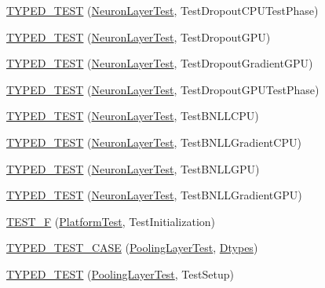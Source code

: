 \begin{DoxyCompactItemize}
\item 
\hyperlink{namespacecaffe_a6974fcca867bc014af426ec1fd8716d6}{T\+Y\+P\+E\+D\+\_\+\+T\+E\+S\+T} (\hyperlink{classcaffe_1_1_neuron_layer_test}{Neuron\+Layer\+Test}, Test\+Dropout\+C\+P\+U\+Test\+Phase)
\item 
\hyperlink{namespacecaffe_a9aa30748d330a1424448fa22c5c24593}{T\+Y\+P\+E\+D\+\_\+\+T\+E\+S\+T} (\hyperlink{classcaffe_1_1_neuron_layer_test}{Neuron\+Layer\+Test}, Test\+Dropout\+G\+P\+U)
\item 
\hyperlink{namespacecaffe_a47d4d4852f59e1990be706e36c600fe0}{T\+Y\+P\+E\+D\+\_\+\+T\+E\+S\+T} (\hyperlink{classcaffe_1_1_neuron_layer_test}{Neuron\+Layer\+Test}, Test\+Dropout\+Gradient\+G\+P\+U)
\item 
\hyperlink{namespacecaffe_a4728e55b8917d9ad09252ab46d6ac9d4}{T\+Y\+P\+E\+D\+\_\+\+T\+E\+S\+T} (\hyperlink{classcaffe_1_1_neuron_layer_test}{Neuron\+Layer\+Test}, Test\+Dropout\+G\+P\+U\+Test\+Phase)
\item 
\hyperlink{namespacecaffe_a0007aaf79b23dc8e44c0f74d90f0b106}{T\+Y\+P\+E\+D\+\_\+\+T\+E\+S\+T} (\hyperlink{classcaffe_1_1_neuron_layer_test}{Neuron\+Layer\+Test}, Test\+B\+N\+L\+L\+C\+P\+U)
\item 
\hyperlink{namespacecaffe_a821758a1ac6b1a24e73031eeb86fea3a}{T\+Y\+P\+E\+D\+\_\+\+T\+E\+S\+T} (\hyperlink{classcaffe_1_1_neuron_layer_test}{Neuron\+Layer\+Test}, Test\+B\+N\+L\+L\+Gradient\+C\+P\+U)
\item 
\hyperlink{namespacecaffe_af2fa4fa4c275456ec096407d5ffa1a74}{T\+Y\+P\+E\+D\+\_\+\+T\+E\+S\+T} (\hyperlink{classcaffe_1_1_neuron_layer_test}{Neuron\+Layer\+Test}, Test\+B\+N\+L\+L\+G\+P\+U)
\item 
\hyperlink{namespacecaffe_a5ae7adfd399c3f6559d4b503e1e99ba0}{T\+Y\+P\+E\+D\+\_\+\+T\+E\+S\+T} (\hyperlink{classcaffe_1_1_neuron_layer_test}{Neuron\+Layer\+Test}, Test\+B\+N\+L\+L\+Gradient\+G\+P\+U)
\item 
\hyperlink{namespacecaffe_a54066c78763e1740c2b4102d3e7d6074}{T\+E\+S\+T\+\_\+\+F} (\hyperlink{classcaffe_1_1_platform_test}{Platform\+Test}, Test\+Initialization)
\item 
\hyperlink{namespacecaffe_a5bebb18083df2f8eba126c94b556e76d}{T\+Y\+P\+E\+D\+\_\+\+T\+E\+S\+T\+\_\+\+C\+A\+S\+E} (\hyperlink{classcaffe_1_1_pooling_layer_test}{Pooling\+Layer\+Test}, \hyperlink{namespacecaffe_a131dc2be50f2f10e18450da61cde6b57}{Dtypes})
\item 
\hyperlink{namespacecaffe_a51cba6d3cc8a6fadfe8b00f9f229cf66}{T\+Y\+P\+E\+D\+\_\+\+T\+E\+S\+T} (\hyperlink{classcaffe_1_1_pooling_layer_test}{Pooling\+Layer\+Test}, Test\+Setup)

\end{DoxyCompactItemize}

